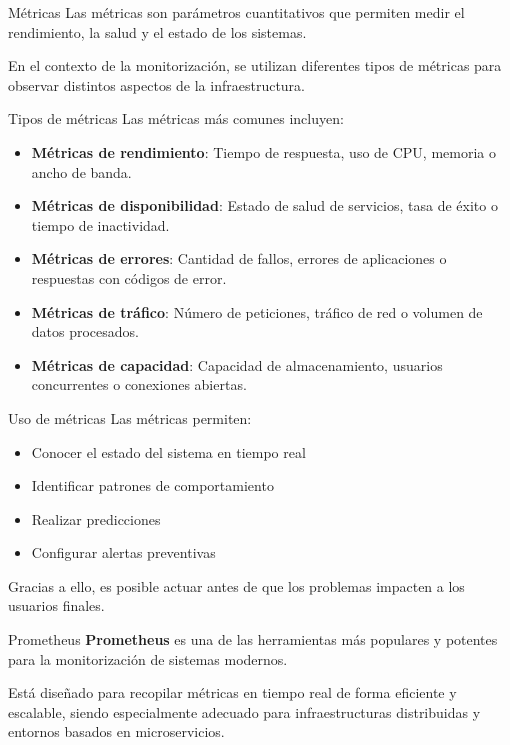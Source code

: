 \documentclass{beamer}
\begin{document}
\begin{frame}{Métricas}
Las métricas son parámetros cuantitativos que permiten medir el rendimiento, la salud y el estado de los sistemas.

En el contexto de la monitorización, se utilizan diferentes tipos de métricas para observar distintos aspectos de la infraestructura.
\end{frame}

\begin{frame}{Tipos de métricas}
Las métricas más comunes incluyen:
\begin{itemize}
  \item \textbf{Métricas de rendimiento}: Tiempo de respuesta, uso de CPU, memoria o ancho de banda.
  \item \textbf{Métricas de disponibilidad}: Estado de salud de servicios, tasa de éxito o tiempo de inactividad.
  \item \textbf{Métricas de errores}: Cantidad de fallos, errores de aplicaciones o respuestas con códigos de error.
  \item \textbf{Métricas de tráfico}: Número de peticiones, tráfico de red o volumen de datos procesados.
  \item \textbf{Métricas de capacidad}: Capacidad de almacenamiento, usuarios concurrentes o conexiones abiertas.
\end{itemize}
\end{frame}

\begin{frame}{Uso de métricas}
Las métricas permiten:
\begin{itemize}
  \item Conocer el estado del sistema en tiempo real
  \item Identificar patrones de comportamiento
  \item Realizar predicciones
  \item Configurar alertas preventivas
\end{itemize}

Gracias a ello, es posible actuar antes de que los problemas impacten a los usuarios finales.
\end{frame}

\begin{frame}{Prometheus}
\textbf{Prometheus} es una de las herramientas más populares y potentes para la monitorización de sistemas modernos.

Está diseñado para recopilar métricas en tiempo real de forma eficiente y escalable, siendo especialmente adecuado para infraestructuras distribuidas y entornos basados en microservicios.
\end{frame}
\end{document}
